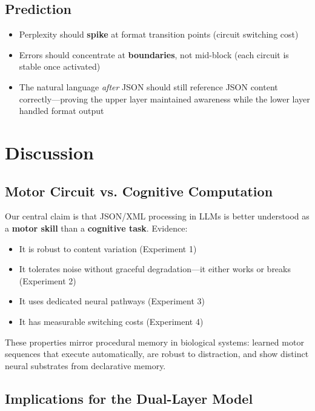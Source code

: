 \documentclass[11pt,a4paper]{article}
\begin{document}
\subsection{Prediction}

\begin{itemize}
    \item Perplexity should \textbf{spike} at format transition points (circuit switching cost)
    \item Errors should concentrate at \textbf{boundaries}, not mid-block (each circuit is stable once activated)
    \item The natural language \textit{after} JSON should still reference JSON content correctly---proving the upper layer maintained awareness while the lower layer handled format output
\end{itemize}

\section{Discussion}

\subsection{Motor Circuit vs. Cognitive Computation}

Our central claim is that JSON/XML processing in LLMs is better understood as a \textbf{motor skill} than a \textbf{cognitive task}. Evidence:

\begin{itemize}
    \item It is robust to content variation (Experiment 1)
    \item It tolerates noise without graceful degradation---it either works or breaks (Experiment 2)
    \item It uses dedicated neural pathways (Experiment 3)
    \item It has measurable switching costs (Experiment 4)
\end{itemize}

These properties mirror procedural memory in biological systems: learned motor sequences that execute automatically, are robust to distraction, and show distinct neural substrates from declarative memory.

\subsection{Implications for the Dual-Layer Model}
\end{document}
